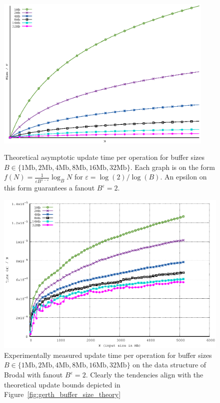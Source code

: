 \documentclass[twoside,11pt,openright]{report}
\def \epsilon {\varepsilon}
\begin{document}
\begin{figure}[htp]
\centering
\includegraphics[width=0.93\textwidth]{../plots/gerth_update_buffer_size/gerth_buffer_size}
\caption{Theoretical asymptotic update time per operation for buffer sizes \\ $B \in \{1 \text{Mb}, 2 \text{Mb}, 4 \text{Mb}, 8 \text{Mb}, 16 \text{Mb}, 32\text{Mb} \}$. Each graph is on the form $f(N) = \frac{1}{\epsilon B^{1-\epsilon}} \log_B N$ for $\epsilon = \log(2) / \log(B)$. An epsilon on this form guarantees a fanout $B^\epsilon = 2$.}
\label{fig:gerth_buffer_size_theory}

\includegraphics[width=\textwidth]{../src/experiments/gerth_buffer_size_experiment_results/2016-05-03.13_51_54/time}
\caption{Experimentally measured update time per operation for buffer sizes \\ $B \in \{1 \text{Mb}, 2 \text{Mb}, 4 \text{Mb}, 8 \text{Mb}, 16 \text{Mb}, 32 \text{Mb} \}$ on the data structure of Brodal with fanout $B^\epsilon = 2$. Clearly the tendencies align with the theoretical update bounds depicted in Figure~\ref{fig:gerth_buffer_size_theory}}
\label{fig:gerth_buffer_size_experiment}
\end{figure}
\end{document}
